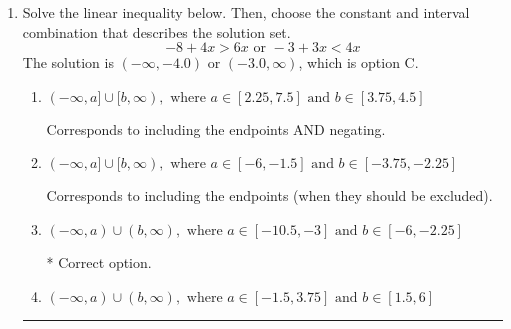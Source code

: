\documentclass{extbook}[14pt]
\newcommand{\litem}[1]{\item #1

\rule{\textwidth}{0.4pt}}
\begin{document}
\begin{enumerate}
{\begin{enumerate}[label=\Alph*.]
$(-\infty, 2.75] \cup (-10.25, \infty)$, which corresponds to displaying the and-inequality as an or-inequality and getting negatives of the actual endpoints.
\item \( [a, b), \text{ where } a \in [1.5, 3.75] \text{ and } b \in [-12, -9] \)

$[2.75, -10.25)$, which is the correct interval but negatives of the actual endpoints.
\item \( (-\infty, a) \cup [b, \infty), \text{ where } a \in [1.5, 6] \text{ and } b \in [-11.25, -6] \)

$(-\infty, 2.75) \cup [-10.25, \infty)$, which corresponds to displaying the and-inequality as an or-inequality AND flipping the inequality AND getting negatives of the actual endpoints.
\item \( (a, b], \text{ where } a \in [2.25, 7.5] \text{ and } b \in [-12.75, -6.75] \)

$(2.75, -10.25]$, which corresponds to flipping the inequality and getting negatives of the actual endpoints.
\item \( \text{None of the above.} \)

* This is correct as the answer should be $[-2.75, 10.25)$.
\end{enumerate}

\textbf{General Comment:} To solve, you will need to break up the compound inequality into two inequalities. Be sure to keep track of the inequality! It may be best to draw a number line and graph your solution.
}
\litem{
Solve the linear inequality below. Then, choose the constant and interval combination that describes the solution set.
\[ -8 + 4 x > 6 x \text{ or } -3 + 3 x < 4 x \]The solution is \( (-\infty, -4.0) \text{ or } (-3.0, \infty) \), which is option C.\begin{enumerate}[label=\Alph*.]
\item \( (-\infty, a] \cup [b, \infty), \text{ where } a \in [2.25, 7.5] \text{ and } b \in [3.75, 4.5] \)

Corresponds to including the endpoints AND negating.
\item \( (-\infty, a] \cup [b, \infty), \text{ where } a \in [-6, -1.5] \text{ and } b \in [-3.75, -2.25] \)

Corresponds to including the endpoints (when they should be excluded).
\item \( (-\infty, a) \cup (b, \infty), \text{ where } a \in [-10.5, -3] \text{ and } b \in [-6, -2.25] \)

 * Correct option.
\item \( (-\infty, a) \cup (b, \infty), \text{ where } a \in [-1.5, 3.75] \text{ and } b \in [1.5, 6] \)


\end{enumerate}}
\end{enumerate}
\end{document}

